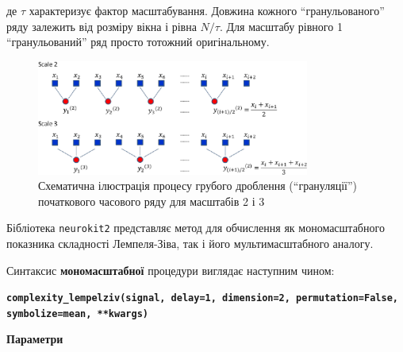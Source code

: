 \documentclass[
  letterpaper,
]{report}
\begin{document}
де \(\tau\) характеризує фактор масштабування. Довжина кожного
``гранульованого'' ряду залежить від розміру вікна \(і\) рівна
\(N/\tau\). Для масштабу рівного 1 ``гранульований'' ряд просто тотожний
оригінальному.

\begin{figure}

{\centering 

\includegraphics[width=0.8\textwidth,height=\textheight]{Images/lab_4/3-Figure1-1.png}

}

\caption{\label{fig-granulation}Схематична ілюстрація процесу грубого
дроблення (``грануляції'') початкового часового ряду для масштабів 2 і
3}

\end{figure}

Бібліотека \texttt{neurokit2} представляє метод для обчислення як
мономасштабного показника складності Лемпеля-Зіва, так і його
мультимасштабного аналогу.

Синтаксис \textbf{мономасштабної} процедури виглядає наступним чином:

\textbf{\texttt{complexity\_lempelziv(signal,\ delay=1,\ dimension=2,\ permutation=False,\ symbolize=\textquotesingle{}mean\textquotesingle{},\ **kwargs)}}

\textbf{Параметри}
\end{document}
